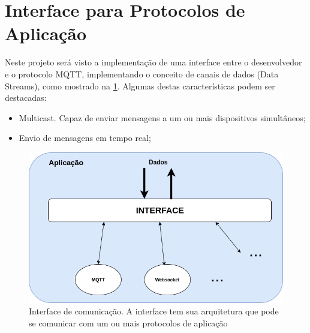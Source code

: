 \section{Interface para Protocolos de Aplicação}
\label{section:interface_iot}

Neste projeto será visto a implementação de uma interface entre o desenvolvedor e  o protocolo MQTT, implementando o conceito de canais de dados (Data Streams), como mostrado na \ref{fig:2.2.0/camada_abatracao}.  Algumas destas características podem ser destacadas:

\begin{itemize}

\item Multicast. Capaz de enviar mensagens a um ou mais dispositivos simultâneos;
\item Envio de mensagens em tempo real;

\end{itemize}


\begin{figure}[h!]
\centering
\includegraphics[width=12cm]{./02_Capitulos/02_Cap2/figures/camada_abstracao}
\caption{Interface de comunicação. A interface tem sua arquitetura que pode se comunicar com um ou mais protocolos de aplicação}
\label{fig:2.2.0/camada_abatracao}
\end{figure}

